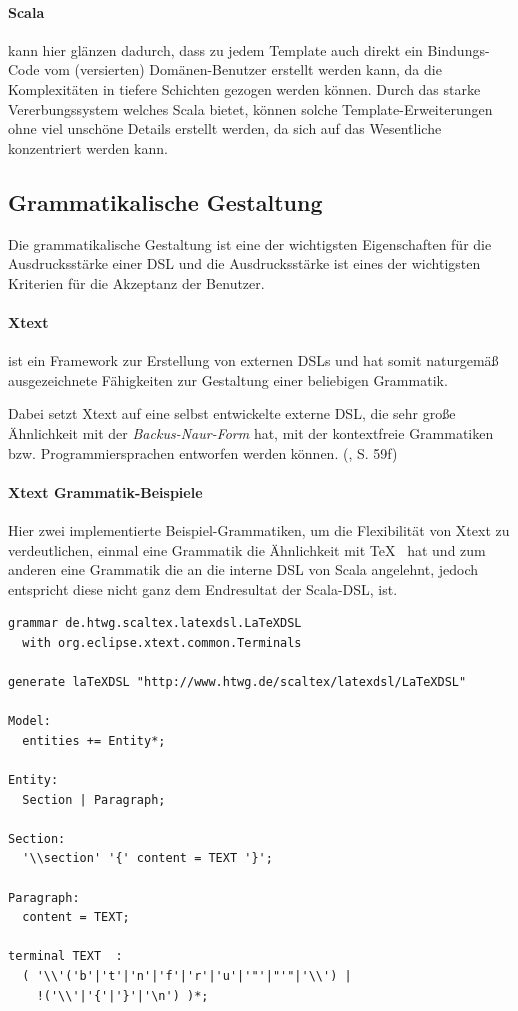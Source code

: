 \paragraph{Scala} kann hier glänzen dadurch, dass zu jedem Template auch
direkt ein Bindungs-Code vom (versierten) Domänen-Benutzer erstellt
werden kann, da die Komplexitäten in tiefere Schichten gezogen werden können.
Durch das starke Vererbungssystem welches Scala bietet, können solche
Template-Erweiterungen ohne viel unschöne Details erstellt werden, da sich
auf das Wesentliche konzentriert werden kann.


\subsection{Grammatikalische Gestaltung}\label{sec-grammatikGestaltung}

Die grammatikalische Gestaltung ist eine der wichtigsten Eigenschaften
für die Ausdrucksstärke einer DSL und die Ausdrucksstärke ist eines
der wichtigsten Kriterien für die Akzeptanz der Benutzer.

\paragraph{Xtext} ist ein Framework zur Erstellung von externen DSLs und
hat somit naturgemäß ausgezeichnete Fähigkeiten zur Gestaltung einer beliebigen
Grammatik.

Dabei setzt Xtext auf eine selbst entwickelte externe DSL, die sehr große
Ähnlichkeit mit der \emph{Backus-Naur-Form} hat, mit der kontextfreie
Grammatiken bzw. Programmiersprachen entworfen werden können.
(\cite{xtext}, S. 59f)

\paragraph{Xtext Grammatik-Beispiele}

Hier zwei implementierte Beispiel-Grammatiken, um die Flexibilität von
Xtext zu verdeutlichen, einmal eine Grammatik die Ähnlichkeit mit \TeX~
hat und zum anderen eine Grammatik die an die interne DSL von Scala angelehnt,
jedoch entspricht diese nicht ganz dem Endresultat der Scala-DSL, ist.

\begin{lstlisting}[caption=\TeX-ähnliches Xtext-Grammatik-Snippet.]
grammar de.htwg.scaltex.latexdsl.LaTeXDSL
  with org.eclipse.xtext.common.Terminals

generate laTeXDSL "http://www.htwg.de/scaltex/latexdsl/LaTeXDSL"

Model:
  entities += Entity*;

Entity:
  Section | Paragraph;

Section:
  '\\section' '{' content = TEXT '}';

Paragraph:
  content = TEXT;

terminal TEXT  : 
  ( '\\'('b'|'t'|'n'|'f'|'r'|'u'|'"'|"'"|'\\') |
    !('\\'|'{'|'}'|'\n') )*;
\end{lstlisting}

